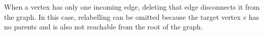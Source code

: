 When a vertex has only one incoming edge, deleting that edge disconnects it from the graph. 
In this case, relabelling can be omitted because the target vertex $v$ has no parents and is also not reachable from the root of the graph. 







